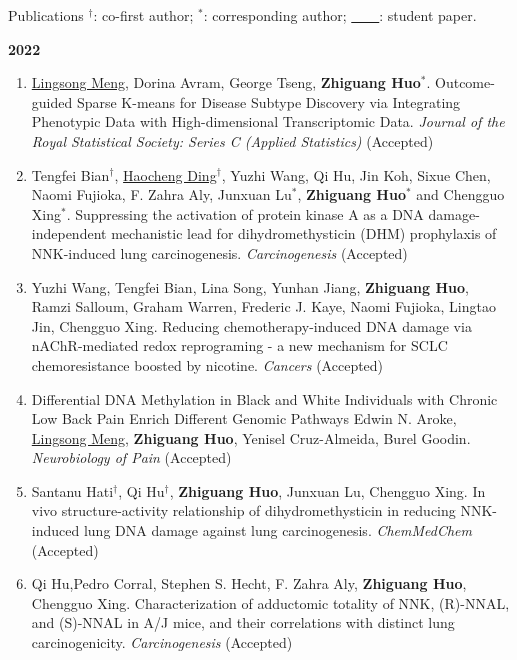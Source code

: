 \documentclass{resume} %
\begin{document}
\begin{rSection}{Publications}
$^\dagger$: co-first author; $^*$: corresponding author; \underline{\mbox{ }\mbox{ }\mbox{ }\mbox{ }}: student paper.


\textbf{2022}
\begin{enumerate}[noitemsep,topsep=0pt, resume]

\item
\underline{Lingsong Meng}, Dorina Avram, George Tseng, {\bf Zhiguang Huo}$^*$.
Outcome-guided Sparse K-means for Disease Subtype Discovery via Integrating Phenotypic Data with High-dimensional Transcriptomic Data.
\emph{Journal of the Royal Statistical Society: Series C (Applied Statistics)} (Accepted)

\item
Tengfei Bian$^\dagger$, \underline{Haocheng Ding}$^\dagger$, Yuzhi Wang, Qi Hu, Jin Koh, Sixue Chen, Naomi Fujioka, F. Zahra Aly, Junxuan Lu$^*$, {\bf Zhiguang Huo}$^*$ and Chengguo Xing$^*$.
Suppressing the activation of protein kinase A as a DNA damage-independent mechanistic lead for dihydromethysticin (DHM) prophylaxis of NNK-induced lung carcinogenesis.
\emph{Carcinogenesis} (Accepted)

\item
Yuzhi Wang, Tengfei Bian, Lina Song, Yunhan Jiang, {\bf Zhiguang Huo}, Ramzi Salloum, Graham Warren, Frederic J. Kaye, Naomi Fujioka, Lingtao Jin, Chengguo Xing.
Reducing chemotherapy-induced DNA damage via nAChR-mediated redox reprograming - a new mechanism for SCLC chemoresistance boosted by nicotine.
\emph{Cancers} (Accepted)

\item
Differential DNA Methylation in Black and White Individuals with Chronic Low Back Pain Enrich Different Genomic Pathways
Edwin N. Aroke, \underline{Lingsong Meng}, {\bf Zhiguang Huo}, Yenisel Cruz-Almeida, Burel Goodin.
\emph{Neurobiology of Pain} (Accepted)

\item
Santanu Hati$^\dagger$, Qi Hu$^\dagger$, {\bf Zhiguang Huo}, Junxuan Lu, Chengguo Xing. 
In vivo structure-activity relationship of dihydromethysticin in reducing NNK-induced lung DNA damage against lung carcinogenesis.
\emph{ChemMedChem} (Accepted)

\item
Qi Hu,Pedro Corral, Stephen S. Hecht, F. Zahra Aly,  {\bf Zhiguang Huo}, Chengguo Xing.
Characterization of adductomic totality of NNK, (R)-NNAL, and (S)-NNAL in A/J mice, and their correlations with distinct lung carcinogenicity. 
\emph{Carcinogenesis} (Accepted)


\end{enumerate}
\end{rSection}
\end{document}

